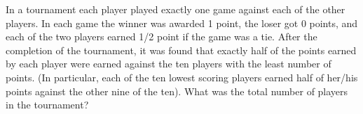 In a tournament each player played exactly one game against each of the other players.  In each game the winner was awarded 1 point, the loser got 0 points, and each of the two players earned 1/2 point if the game was a tie.  After the completion of the tournament, it was found that exactly half of the points earned by each player were earned against the ten players with the least number of points.  (In particular, each of the ten lowest scoring players earned half of her/his points against the other nine of the ten).  What was the total number of players in the tournament?